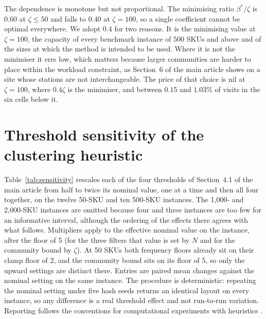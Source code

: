 \documentclass[11pt]{article}
\begin{document}
The dependence is monotone but not proportional. The minimising ratio $\beta^\ast/\zeta$ is
$0.60$ at $\zeta\le 50$ and falls to $0.40$ at $\zeta=100$, so a single coefficient cannot be
optimal everywhere. We adopt $0.4$ for two reasons. It is the minimising value at $\zeta=100$,
the capacity of every benchmark instance of 500 SKUs and above and of the sizes at which the
method is intended to be used. Where it is not the minimiser it errs low, which matters because
larger communities are harder to place within the workload constraint, as Section~6 of the main
article shows on a site whose stations are not interchangeable. The price of that choice is nil
at $\zeta=100$, where $0.4\zeta$ is the minimiser, and between $0.15$ and $1.03$\% of visits in
the six cells below it.

\section{Threshold sensitivity of the clustering heuristic}\label{sup:sensitivity}
Table~\ref{tab:sensitivity} rescales each of the four thresholds of Section~4.1 of the main
article from half to twice its nominal value, one at a time and then all four together, on the
twelve 50-SKU and ten 500-SKU instances. The 1,000- and 2,000-SKU instances are omitted because
four and three instances are too few for an informative interval, although the ordering of the
effects there agrees with what follows. Multipliers apply to the effective nominal value on the
instance, after the floor of 5 (for the three filters that value is set by $N$ and for the
community bound by $\zeta$). At 50 SKUs both frequency floors already sit on their clamp floor
of 2, and the community bound sits on its floor of 5, so only the upward settings are distinct
there. Entries are paired mean changes against the nominal setting on the same instance. The
procedure is deterministic: repeating the nominal setting under five hash seeds returns an
identical layout on every instance, so any difference is a real threshold effect and not
run-to-run variation. Reporting follows the conventions for computational experiments with
heuristics \citep{barr1995designing, hooker1995testing}.
\end{document}

